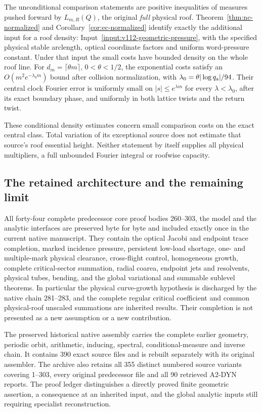 \documentclass[11pt,reqno]{amsart}
\numberwithin{equation}{section}
\theoremstyle{definition}\newtheorem{definition}[theorem]{Definition}
\theoremstyle{remark}\newtheorem{remark}[theorem]{Remark}
\begin{document}
The unconditional comparison statements are positive inequalities
of measures pushed forward by $L_{m,R}(Q)$, the original
\emph{full} physical roof.  Theorem~\ref{thm:nc-normalized} and
Corollary~\ref{cor:ec-normalized} identify exactly the additional
input for a roof density: Input~\ref{input:v112-geometric-pressure},
with the specified physical stable arclength, optical coordinate
factors and uniform word-pressure constant.  Under that input the
small costs have bounded density on the whole roof line.  For
$d_m=\lceil\theta m\rceil$, $0<\theta<1/2$, the exponential
costs satisfy an $O(m^2e^{-\lambda_0m})$ bound after collision
normalization, with
$\lambda_0=\theta|\log q_{\rm a}|/94$.
Their central clock Fourier error is uniformly small on
$|s|\le e^{\lambda m}$ for every $\lambda<\lambda_0$, after its
exact boundary phase, and uniformly in both lattice twists and
the return twist.

These conditional density estimates concern small comparison
costs on the exact central class.  Total variation of its
exceptional source does not estimate that source's roof essential
height.  Neither statement by itself supplies all physical
multipliers, a full unbounded Fourier integral or roofwise capacity.

\subsection*{The retained architecture and the remaining limit}
All forty-four complete predecessor core proof bodies 260--303,
the model and the analytic interfaces are preserved byte for byte
and included exactly once in the current native manuscript.
They contain the optical Jacobi and endpoint trace completion,
marked incidence pressure, persistent low-load shortage, one- and
multiple-mark physical clearance, cross-flight control, homogeneous
growth, complete critical-sector summation, radial coarea,
endpoint jets and resolvents, physical tubes, bending, and the
global variational and summable sublevel theorems.  In particular
the physical curve-growth hypothesis is discharged by the native
chain 281--283, and the complete regular critical coefficient
and common physical-roof unscaled summations are inherited results.
Their completion is not presented as a new assumption or a new
contribution.

The preserved historical native assembly carries the complete
earlier geometry, periodic orbit, arithmetic, inducing, spectral,
conditional-measure and inverse chain.  It contains 390 exact
source files and is rebuilt separately with its original assembler.
The archive also retains all 355 distinct numbered source variants
covering 1--303, every original predecessor file and all 90
retrieved A2-DYN reports.  The proof ledger distinguishes a directly
proved finite geometric assertion, a consequence at an inherited
input, and the global analytic inputs still requiring specialist
reconstruction.
\end{document}
